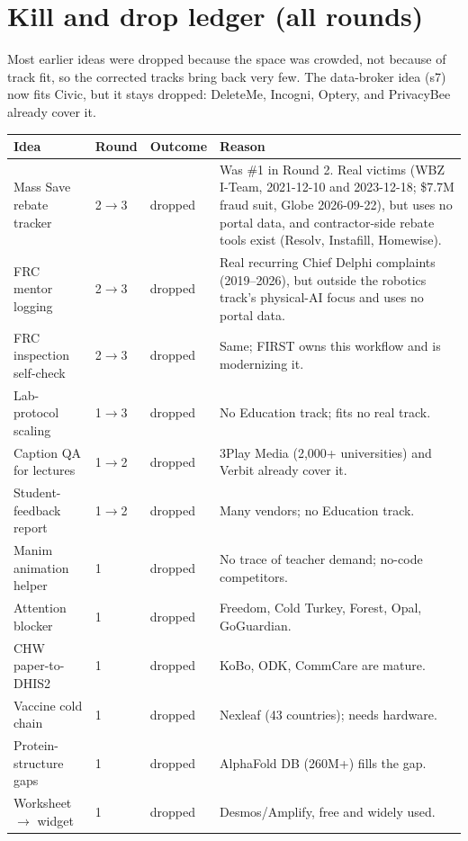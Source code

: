 \documentclass[11pt]{article}
\begin{document}
\section{Kill and drop ledger (all rounds)}
Most earlier ideas were dropped because the space was crowded, not because of track fit, so
the corrected tracks bring back very few. The data-broker idea (s7) now fits Civic, but it
stays dropped: DeleteMe, Incogni, Optery, and PrivacyBee already cover it.

\begin{longtable}{@{}L{3.3cm} L{1.4cm} L{1.5cm} L{8.5cm}@{}}
\toprule
\textbf{Idea} & \textbf{Round} & \textbf{Outcome} & \textbf{Reason}\\
\midrule
\endhead
Mass Save rebate tracker & 2$\rightarrow$3 & dropped & Was \#1 in Round 2. Real victims (WBZ I-Team, 2021-12-10 and 2023-12-18; \$7.7M fraud suit, Globe 2026-09-22), but uses no portal data, and contractor-side rebate tools exist (Resolv, Instafill, Homewise).\\
FRC mentor logging & 2$\rightarrow$3 & dropped & Real recurring Chief Delphi complaints (2019--2026), but outside the robotics track's physical-AI focus and uses no portal data.\\
FRC inspection self-check & 2$\rightarrow$3 & dropped & Same; FIRST owns this workflow and is modernizing it.\\
Lab-protocol scaling & 1$\rightarrow$3 & dropped & No Education track; fits no real track.\\
Caption QA for lectures & 1$\rightarrow$2 & dropped & 3Play Media (2,000+ universities) and Verbit already cover it.\\
Student-feedback report & 1$\rightarrow$2 & dropped & Many vendors; no Education track.\\
Manim animation helper & 1 & dropped & No trace of teacher demand; no-code competitors.\\
Attention blocker & 1 & dropped & Freedom, Cold Turkey, Forest, Opal, GoGuardian.\\
CHW paper-to-DHIS2 & 1 & dropped & KoBo, ODK, CommCare are mature.\\
Vaccine cold chain & 1 & dropped & Nexleaf (43 countries); needs hardware.\\
Protein-structure gaps & 1 & dropped & AlphaFold DB (260M+) fills the gap.\\
Worksheet $\rightarrow$ widget & 1 & dropped & Desmos/Amplify, free and widely used.\\

\end{longtable}
\end{document}
